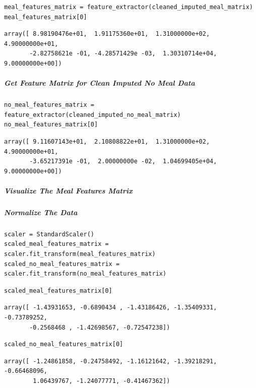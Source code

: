 \begin{verbatim}
meal_features_matrix = feature_extractor(cleaned_imputed_meal_matrix)
meal_features_matrix[0]
\end{verbatim}

\begin{verbatim}
array([ 8.98190476e+01,  1.91175360e+01,  1.31000000e+02,  4.90000000e+01,
       -2.82758621e -01, -4.28571429e -03,  1.30310714e+04,  9.00000000e+00])
\end{verbatim}

\subparagraph{Get Feature Matrix for Clean Imputed No Meal Data}

\begin{verbatim}
no_meal_features_matrix = feature_extractor(cleaned_imputed_no_meal_matrix)
no_meal_features_matrix[0]
\end{verbatim}

\begin{verbatim}
array([ 9.11607143e+01,  2.10808822e+01,  1.31000000e+02,  4.90000000e+01,
       -3.65217391e -01,  2.00000000e -02,  1.04699405e+04,  9.00000000e+00])
\end{verbatim}

\subparagraph{Visualize The Meal Features Matrix}

\subparagraph{Normalize The Data}

\begin{verbatim}
scaler = StandardScaler()
scaled_meal_features_matrix = scaler.fit_transform(meal_features_matrix)
scaled_no_meal_features_matrix = scaler.fit_transform(no_meal_features_matrix)
\end{verbatim}

\begin{verbatim}
scaled_meal_features_matrix[0]
\end{verbatim}

\begin{verbatim}
array([ -1.43931653, -0.6890434 , -1.43186426, -1.35409331, -0.73789252,
       -0.2568468 , -1.42698567, -0.72547238])
\end{verbatim}

\begin{verbatim}
scaled_no_meal_features_matrix[0]
\end{verbatim}

\begin{verbatim}
array([ -1.24861858, -0.24758492, -1.16121642, -1.39218291, -0.66468096,
        1.06439767, -1.24077771, -0.41467362])
\end{verbatim}

